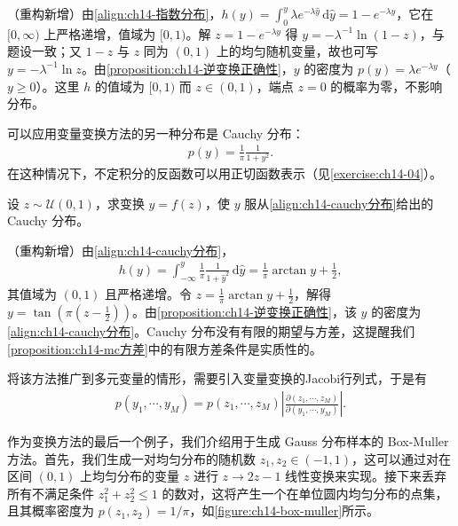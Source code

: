 \documentclass[../../main.tex]{subfiles}
\begin{document}
\begin{solution}（重构新增）由\eqref{align:ch14-指数分布}，$h(y)=\int_{0}^{y}\lambda e^{-\lambda \hat{y}}\,\mathrm{d}\hat{y}=1-e^{-\lambda y}$，它在 $[0,\infty)$ 上严格递增，值域为 $[0,1)$。解 $z=1-e^{-\lambda y}$ 得 $y=-\lambda^{-1}\ln(1-z)$，与题设一致；又 $1-z$ 与 $z$ 同为 $(0,1)$ 上的均匀随机变量，故也可写 $y=-\lambda^{-1}\ln z$。由\cref{proposition:ch14-逆变换正确性}，$y$ 的密度为 $p(y)=\lambda e^{-\lambda y}$（$y\geqslant 0$）。这里 $h$ 的值域为 $[0,1)$ 而 $z\in(0,1)$，端点 $z=0$ 的概率为零，不影响分布。
\end{solution}

可以应用变量变换方法的另一种分布是 Cauchy 分布：
\begin{align}
p(y)=\frac{1}{\pi}\frac{1}{1+y^{2}}.
\label{align:ch14-cauchy分布}
\end{align}
在这种情况下，不定积分的反函数可以用正切函数表示（见\cref{exercise:ch14-04}）。

\begin{example}\label{example:ch14-cauchy分布采样}
设 $z\sim\mathcal{U}(0,1)$，求变换 $y=f(z)$，使 $y$ 服从\eqref{align:ch14-cauchy分布}给出的 Cauchy 分布。
\end{example}

\begin{solution}（重构新增）由\eqref{align:ch14-cauchy分布}，
\begin{align*}
h(y)=\int_{-\infty}^{y}\frac{1}{\pi}\frac{1}{1+\hat{y}^{2}}\,\mathrm{d}\hat{y}=\frac{1}{\pi}\arctan y+\frac{1}{2},
\end{align*}
其值域为 $(0,1)$ 且严格递增。令 $z=\frac{1}{\pi}\arctan y+\frac{1}{2}$，解得 $y=\tan\left(\pi\left(z-\frac{1}{2}\right)\right)$。由\cref{proposition:ch14-逆变换正确性}，该 $y$ 的密度为\eqref{align:ch14-cauchy分布}。Cauchy 分布没有有限的期望与方差，这提醒我们\cref{proposition:ch14-mc方差}中的有限方差条件是实质性的。
\end{solution}

将该方法推广到多元变量的情形，需要引入变量变换的Jacobi行列式，于是有
\begin{align}
p(y_{1},\cdots,y_{M})=p(z_{1},\cdots,z_{M})\left|\frac{\partial(z_{1},\cdots,z_{M})}{\partial(y_{1},\cdots,y_{M})}\right|.
\label{align:ch14-多元变量变换}
\end{align}

作为变换方法的最后一个例子，我们介绍用于生成 Gauss 分布样本的 Box-Muller 方法。首先，我们生成一对均匀分布的随机数 $z_{1},z_{2}\in(-1,1)$，这可以通过对在区间 $(0,1)$ 上均匀分布的变量 $z$ 进行 $z\rightarrow 2z-1$ 线性变换来实现。接下来丢弃所有不满足条件 $z_{1}^{2}+z_{2}^{2}\leqslant 1$ 的数对，这将产生一个在单位圆内均匀分布的点集，且其概率密度为 $p(z_{1},z_{2})=1/\pi$，如\cref{figure:ch14-box-muller}所示。
\end{document}
